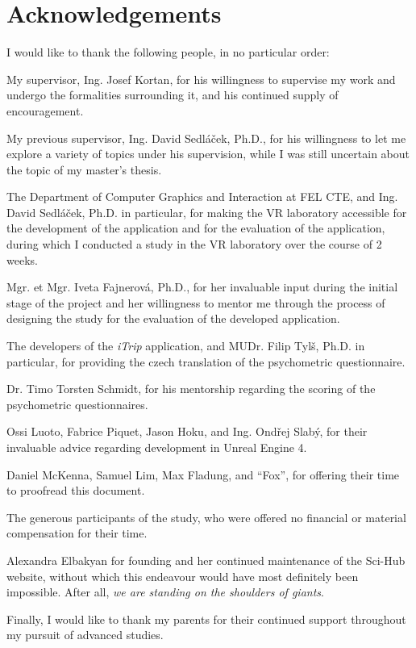 \chapter*{Acknowledgements}

\begin{small}
I would like to thank the following people, in no particular order:

My supervisor, Ing. Josef Kortan, for his willingness to supervise my work and undergo the formalities surrounding it, and his continued supply of encouragement.

My previous supervisor, Ing. David Sedláček, Ph.D., for his willingness to let me explore a variety of topics under his supervision, while I was still uncertain about the topic of my master's thesis.

The Department of Computer Graphics and Interaction at FEL CTE, and Ing. David Sedláček, Ph.D. in particular, for making the VR laboratory accessible for the development of the application and for the evaluation of the application, during which I conducted a study in the VR laboratory over the course of 2 weeks.

Mgr. et Mgr. Iveta Fajnerová, Ph.D., for her invaluable input during the initial stage of the project and her willingness to mentor me through the process of designing the study for the evaluation of the developed application.

The developers of the \textit{iTrip} application, and MUDr. Filip Tylš, Ph.D. in particular, for providing the czech translation of the psychometric questionnaire.

Dr. Timo Torsten Schmidt, for his mentorship regarding the scoring of the psychometric questionnaires.

Ossi Luoto, Fabrice Piquet, Jason Hoku, and Ing. Ondřej Slabý, for their invaluable advice regarding development in Unreal Engine 4.

Daniel McKenna, Samuel Lim, Max Fladung, and ``Fox'', for offering their time to proofread this document.

The generous participants of the study, who were offered no financial or material compensation for their time.

Alexandra Elbakyan for founding and her continued maintenance of the Sci-Hub website, without which this endeavour would have most definitely been impossible. After all, \textit{we are standing on the shoulders of giants}.

Finally, I would like to thank my parents for their continued support throughout my pursuit of advanced studies.
\end{small}


